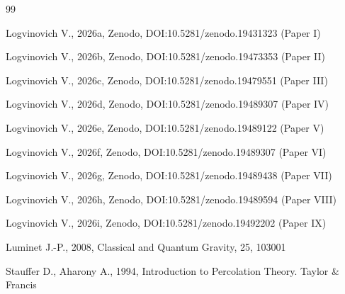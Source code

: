 \documentclass[12pt,a4paper]{article}
\begin{document}
\begin{thebibliography}{99}

Logvinovich V., 2026a, Zenodo, DOI:10.5281/zenodo.19431323 (Paper I)

Logvinovich V., 2026b, Zenodo, DOI:10.5281/zenodo.19473353 (Paper II)

Logvinovich V., 2026c, Zenodo, DOI:10.5281/zenodo.19479551 (Paper III)

Logvinovich V., 2026d, Zenodo, DOI:10.5281/zenodo.19489307 (Paper IV)

Logvinovich V., 2026e, Zenodo, DOI:10.5281/zenodo.19489122 (Paper V)

Logvinovich V., 2026f, Zenodo, DOI:10.5281/zenodo.19489307 (Paper VI)

Logvinovich V., 2026g, Zenodo, DOI:10.5281/zenodo.19489438 (Paper VII)

Logvinovich V., 2026h, Zenodo, DOI:10.5281/zenodo.19489594 (Paper VIII)

Logvinovich V., 2026i, Zenodo, DOI:10.5281/zenodo.19492202 (Paper IX)

Luminet J.-P., 2008, Classical and Quantum Gravity, 25, 103001

Stauffer D., Aharony A., 1994, Introduction to Percolation Theory. Taylor \& Francis

\end{thebibliography}
\end{document}

